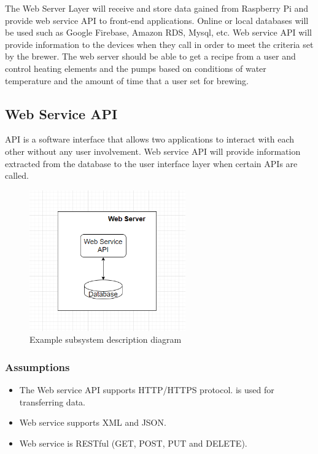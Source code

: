 The Web Server Layer will receive and store data gained from Raspberry Pi and provide web service API to front-end applications. Online or local databases will be used such as Google Firebase, Amazon RDS, Mysql, etc. Web service API will provide information to the devices when they call in order to meet the criteria set by the brewer. The web server should be able to get a recipe from a user and control heating elements and the pumps based on conditions of water temperature and the amount of time that a user set for brewing.

\subsection{Web Service API}
API is a software interface that allows two applications to interact with each other without any user involvement. Web service API will provide information extracted from the database to the user interface layer when certain APIs are called.

\begin{figure}[h!]
	\centering
 	\includegraphics[width=0.60\textwidth]{images/web_layer.PNG}
 \caption{Example subsystem description diagram}
\end{figure}

\subsubsection{Assumptions}

\begin {itemize}
\item 
The Web service API supports HTTP/HTTPS protocol. is used for transferring data.
\item 
Web service supports XML and JSON.
\item 
Web service is RESTful (GET, POST, PUT and DELETE).
\end {itemize}


